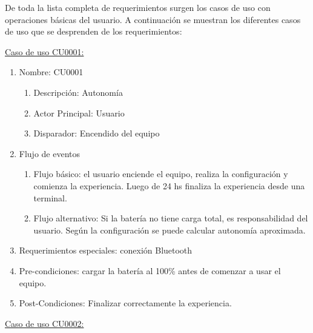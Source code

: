 De toda la lista completa de requerimientos surgen los casos de uso con operaciones básicas del usuario. A continuación se muestran los diferentes casos de uso que se desprenden de los requerimientos:

	\underline{Caso de uso CU0001:}

	\begin{enumerate} 
		\item Nombre: CU0001
		\begin{enumerate} [label*=\arabic*.]
			\item Descripción: Autonomía
			\item Actor Principal: Usuario
			\item Disparador: Encendido del equipo		
		\end{enumerate}
		\item Flujo de eventos
		\begin{enumerate} [label*=\arabic*.]
			\item Flujo básico: el usuario enciende el equipo, realiza la configuración y comienza la experiencia. Luego de 24 hs finaliza la experiencia desde una terminal.
			\item Flujo alternativo: Si la batería no tiene carga total, es responsabilidad del usuario. Según la configuración se puede calcular autonomía aproximada.
		\end{enumerate}

		\item Requerimientos especiales: conexión Bluetooth
		\item Pre-condiciones: cargar la batería al 100\% antes de comenzar a usar el equipo.
		\item Post-Condiciones: Finalizar correctamente la experiencia.				
	\end{enumerate}

	\underline{Caso de uso CU0002:}

